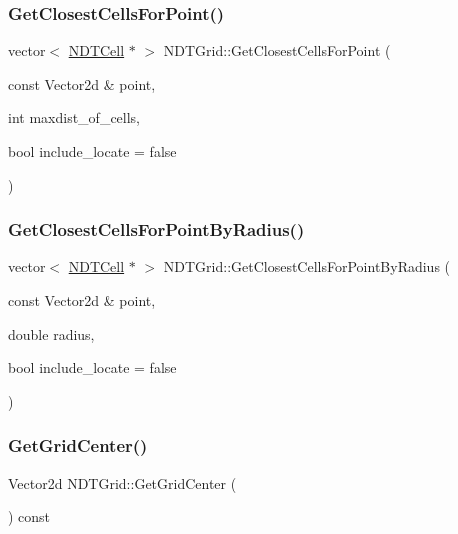 \subsubsection{\texorpdfstring{Get\+Closest\+Cells\+For\+Point()}{GetClosestCellsForPoint()}}
{\footnotesize\ttfamily vector$<$ \hyperlink{classNDTCell}{N\+D\+T\+Cell} $\ast$ $>$ N\+D\+T\+Grid\+::\+Get\+Closest\+Cells\+For\+Point (\begin{DoxyParamCaption}\item[{const Vector2d \&}]{point,  }\item[{int}]{maxdist\+\_\+of\+\_\+cells,  }\item[{bool}]{include\+\_\+locate = {\ttfamily false} }\end{DoxyParamCaption})}

\mbox{\label{classNDTGrid_ab26b25cf8ccd37ecf99c34fb60f79e90}} 
\subsubsection{\texorpdfstring{Get\+Closest\+Cells\+For\+Point\+By\+Radius()}{GetClosestCellsForPointByRadius()}}
{\footnotesize\ttfamily vector$<$ \hyperlink{classNDTCell}{N\+D\+T\+Cell} $\ast$ $>$ N\+D\+T\+Grid\+::\+Get\+Closest\+Cells\+For\+Point\+By\+Radius (\begin{DoxyParamCaption}\item[{const Vector2d \&}]{point,  }\item[{double}]{radius,  }\item[{bool}]{include\+\_\+locate = {\ttfamily false} }\end{DoxyParamCaption})}

\mbox{\label{classNDTGrid_ae65d3aa2f34bf0801456df852853950e}} 
\subsubsection{\texorpdfstring{Get\+Grid\+Center()}{GetGridCenter()}}
{\footnotesize\ttfamily Vector2d N\+D\+T\+Grid\+::\+Get\+Grid\+Center (\begin{DoxyParamCaption}{ }\end{DoxyParamCaption}) const\hspace{0.3cm}{\ttfamily [inline]}}

